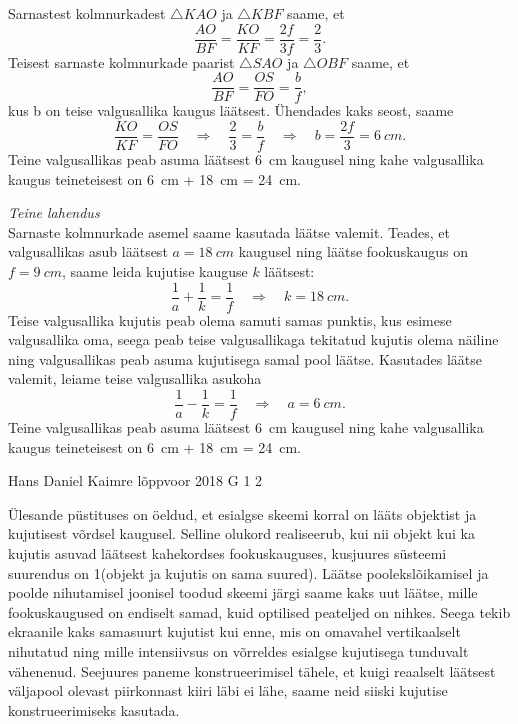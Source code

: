 \documentclass[11pt]{article}
\begin{document}
{{Sarnastest kolmnurkadest $\triangle KAO$ ja $\triangle KBF$ saame, et
\[ \frac{AO}{BF} = \frac{KO}{KF} = \frac{2f}{3f} = \frac{2}{3}. \]
Teisest sarnaste kolmnurkade paarist $\triangle SAO$ ja $\triangle OBF$ saame, et
\[ \frac{AO}{BF} = \frac{OS}{FO} = \frac{b}{f}, \]
kus b on teise valgusallika kaugus läätsest. Ühendades kaks seost, saame
\[ \frac{KO}{KF}=\frac{OS}{FO} \quad\Rightarrow\quad \frac{2}{3} = \frac{b}{f} \quad\Rightarrow\quad b = \frac{2f}{3} = \SI{6}{cm}. \]
Teine valgusallikas peab asuma läätsest \SI{6}{cm} kaugusel ning kahe valgusallika kaugus teineteisest on \SI{6}{cm} + \SI{18}{cm} = \SI{24}{cm}.

\vspace{\baselineskip}
\emph{Teine lahendus}\\
Sarnaste kolmnurkade asemel saame kasutada läätse valemit. Teades, et valgusallikas asub läätsest $a = \SI{18}{cm}$ kaugusel ning läätse fookuskaugus on $f=\SI{9}{cm}$, saame leida kujutise kauguse $k$ läätsest:
\[ \frac{1}{a} + \frac{1}{k} = \frac{1}{f} \quad\Rightarrow\quad k = \SI{18}{cm}. \]
Teise valgusallika kujutis peab olema samuti samas punktis, kus esimese valgusallika oma, seega peab teise valgusallikaga tekitatud kujutis olema näiline ning valgusallikas peab asuma kujutisega samal pool läätse. Kasutades läätse valemit, leiame teise valgusallika asukoha
\[ \frac{1}{a} - \frac{1}{k} = \frac{1}{f} \quad\Rightarrow\quad a = \SI{6}{cm}. \]
Teine valgusallikas peab asuma läätsest \SI{6}{cm} kaugusel ning kahe valgusallika kaugus teineteisest on \SI{6}{cm} + \SI{18}{cm} = \SI{24}{cm}.
\fi
}

{Hans Daniel Kaimre} %
{lõppvoor} %
{2018} %
{G 1} %
{2} %
{

\ifSolution
Ülesande püstituses on öeldud, et esialgse skeemi korral on lääts objektist ja kujutisest võrdsel kaugusel. Selline olukord realiseerub, kui nii objekt kui ka kujutis asuvad läätsest kahekordses fookuskauguses, kusjuures süsteemi suurendus on 1(objekt ja kujutis on sama suured). Läätse poolekslõikamisel ja poolde nihutamisel joonisel toodud skeemi järgi saame kaks uut läätse, mille fookuskaugused on endiselt samad, kuid optilised peateljed on nihkes. Seega tekib ekraanile kaks samasuurt kujutist kui enne, mis on omavahel vertikaalselt nihutatud ning mille intensiivsus on võrreldes esialgse kujutisega tunduvalt vähenenud. Seejuures paneme konstrueerimisel tähele, et kuigi reaalselt läätsest väljapool olevast piirkonnast kiiri läbi ei lähe, saame neid siiski kujutise konstrueerimiseks kasutada.

}}
\end{document}
